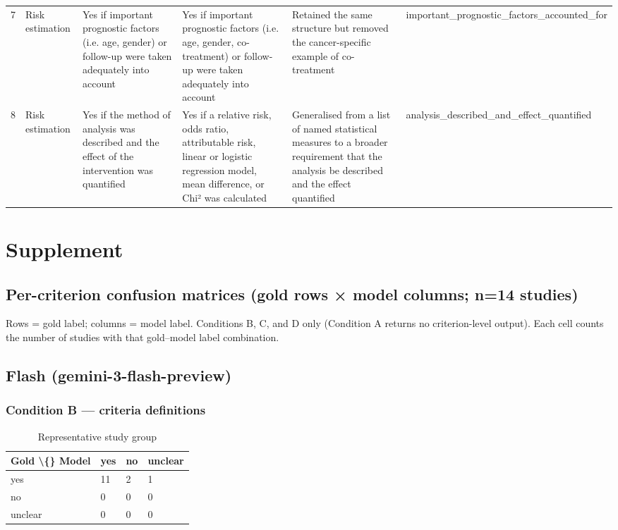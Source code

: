 \documentclass[11pt,a4paper]{article}
\begin{document}
\begin{table}[H]
{\begin{tabular}{llllll}
7 & Risk estimation & Yes if important prognostic factors (i.e. age, gender) or follow-up were taken adequately into account & Yes if important prognostic factors (i.e. age, gender, co-treatment) or follow-up were taken adequately into account & Retained the same structure but removed the cancer-specific example of co-treatment & important\_prognostic\_factors\_accounted\_for \\
8 & Risk estimation & Yes if the method of analysis was described and the effect of the intervention was quantified & Yes if a relative risk, odds ratio, attributable risk, linear or logistic regression model, mean difference, or Chi² was calculated & Generalised from a list of named statistical measures to a broader requirement that the analysis be described and the effect quantified & analysis\_described\_and\_effect\_quantified \\
\bottomrule
\end{tabular}
}
\end{table}

\section{Supplement}

\subsection{Per-criterion confusion matrices (gold rows × model columns; n=14 studies)}

Rows = gold label; columns = model label. Conditions B, C, and D only (Condition A returns no criterion-level output). Each cell counts the number of studies with that gold–model label combination.

\subsection{Flash (gemini-3-flash-preview)}

\subsubsection{Condition B — criteria definitions}

\begin{table}[H]
\centering
\caption{Representative study group}
\label{tab:supp_1}
\begin{tabular}{llll}
\toprule
Gold \textbackslash\{\} Model & yes & no & unclear \\
\midrule
yes & 11 & 2 & 1 \\
no & 0 & 0 & 0 \\
unclear & 0 & 0 & 0 \\
\bottomrule
\end{tabular}
\end{table}
\end{document}
